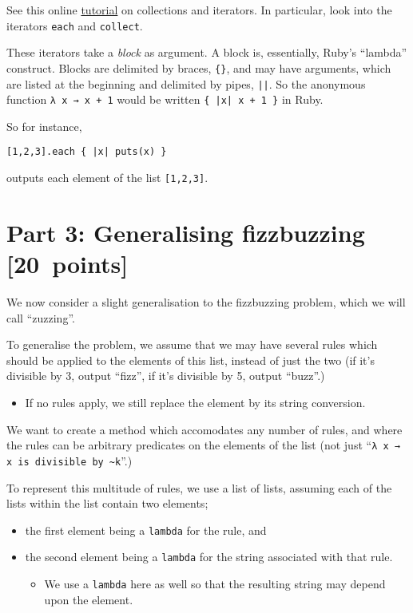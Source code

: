 \documentclass[11pt]{article}
\begin{document}
See this online
\href{https://ruby-doc.com/docs/ProgrammingRuby/html/tut\_containers.html}{tutorial}
on collections and iterators.
In particular, look into the iterators \texttt{each} and \texttt{collect}.

These iterators take a \emph{block} as argument.
A block is, essentially, Ruby's “lambda” construct.
Blocks are delimited by braces, \texttt{\{\}}, and may have
arguments, which are listed at the beginning and
delimited by pipes, \texttt{||}.
So the anonymous function \texttt{λ x → x + 1} would
be written \texttt{\{ |x| x + 1 \}} in Ruby.

So for instance,
\begin{verbatim}
[1,2,3].each { |x| puts(x) }
\end{verbatim}

outputs each element of the list \texttt{[1,2,3]}.

\section*{Part 3: Generalising fizzbuzzing                        [20 points]}
\label{sec:orgd1544bc}
We now consider a slight generalisation to
the fizzbuzzing problem, which we will call “zuzzing”.

To generalise the problem, we assume that we may have
several rules which should be applied to the elements of this list,
instead of just the two (if it's divisible by 3, output “fizz”,
if it's divisible by 5, output “buzz”.)
\begin{itemize}
\item If no rules apply, we still replace the element
by its string conversion.
\end{itemize}

We want to create a method which accomodates any number of rules,
and where the rules can be arbitrary predicates
on the elements of the list
(not just “\texttt{λ x → x is divisible by \textasciitilde{}k}”.)

To represent this multitude of rules, we use a list of lists,
assuming each of the lists within the list contain two elements;
\begin{itemize}
\item the first element being a \texttt{lambda} for the rule, and
\item the second element being a \texttt{lambda} for the string
associated with that rule.
\begin{itemize}
\item We use a \texttt{lambda} here as well so that the resulting string
may depend upon the element.
\end{itemize}
\end{itemize}
\end{document}
